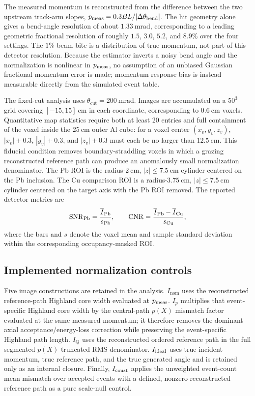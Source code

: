 \documentclass[aps,pra,reprint,longbibliography,floatfix]{revtex4-2}
\newcommand{\thetacut}{\ensuremath{\theta_{\mathrm{cut}}}}
\newcommand{\Inom}{\ensuremath{I_{\mathrm{nom}}}}
\newcommand{\Ip}{\ensuremath{I_p}}
\newcommand{\IQ}{\ensuremath{I_Q}}
\begin{document}
The measured momentum is reconstructed from the difference between the two upstream track-arm slopes, $p_{\rm meas}=0.3BL/|\Delta\theta_{\rm bend}|$.  The hit geometry alone gives a bend-angle resolution of about $1.33~\mathrm{mrad}$, corresponding to a leading geometric fractional resolution of roughly $1.5$, $3.0$, $5.2$, and $8.9\%$ over the four settings.  The $1\%$ beam bite is a distribution of true momentum, not part of this detector resolution.  Because the estimator inverts a noisy bend angle and the normalization is nonlinear in $p_{\rm meas}$, no assumption of an unbiased Gaussian fractional momentum error is made; momentum-response bias is instead measurable directly from the simulated event table.

The fixed-cut analysis uses $\thetacut=200~\mathrm{mrad}$.  Images are accumulated on a $50^3$ grid covering $[-15,15]~\mathrm{cm}$ in each coordinate, corresponding to $0.6~\mathrm{cm}$ voxels.  Quantitative map statistics require both at least 20 entries and full containment of the voxel inside the $25~\mathrm{cm}$ outer Al cube: for a voxel center $(x_v,y_v,z_v)$, $|x_v|+0.3$, $|y_v|+0.3$, and $|z_v|+0.3$ must each be no larger than $12.5~\mathrm{cm}$.  This fiducial condition removes boundary-straddling voxels in which a grazing reconstructed reference path can produce an anomalously small normalization denominator.  The Pb ROI is the radius-$2~\mathrm{cm}$, $|z|\le7.5~\mathrm{cm}$ cylinder centered on the Pb inclusion.  The Cu comparison ROI is a radius-$3.75~\mathrm{cm}$, $|z|\le7.5~\mathrm{cm}$ cylinder centered on the target axis with the Pb ROI removed.  The reported detector metrics are
\begin{equation}
{\rm SNR}_{\rm Pb}=\frac{\overline I_{\rm Pb}}{s_{\rm Pb}},\qquad
{\rm CNR}=\frac{\overline I_{\rm Pb}-\overline I_{\rm Cu}}{s_{\rm Cu}},
\end{equation}
where the bars and $s$ denote the voxel mean and sample standard deviation within the corresponding occupancy-masked ROI.

\subsection{Implemented normalization controls}\label{sec:artifactresults}
Five image constructions are retained in the analysis.  $\Inom$ uses the reconstructed reference-path Highland core width evaluated at $p_{\rm meas}$.  $\Ip$ multiplies that event-specific Highland core width by the central-path $p(X)$ mismatch factor evaluated at the same measured momentum; it therefore removes the dominant axial acceptance/energy-loss correction while preserving the event-specific Highland path length.  $\IQ$ uses the reconstructed ordered reference path in the full segmented-$p(X)$ truncated-RMS denominator.  $I_{\rm ideal}$ uses true incident momentum, true reference path, and the true generated angle and is retained only as an internal closure.  Finally, $I_{\rm const}$ applies the unweighted event-count mean mismatch over accepted events with a defined, nonzero reconstructed reference path as a pure scale-null control.
\end{document}
